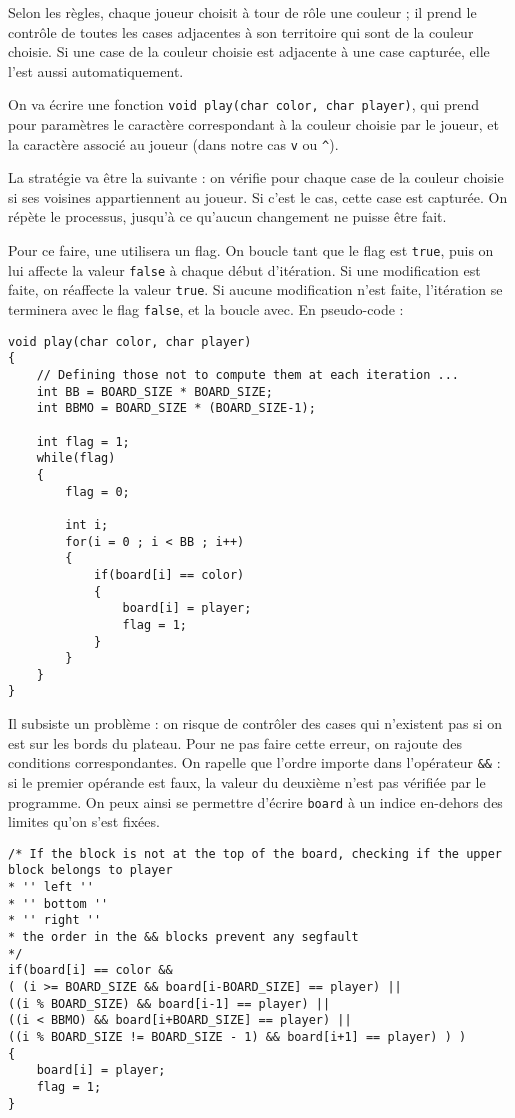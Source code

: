 \documentclass[a4paper,11pt]{article}
\begin{document}
	Selon les règles, chaque joueur choisit à tour de rôle une couleur ; il prend le contrôle de toutes les cases adjacentes à son territoire qui sont de la couleur choisie. Si une case de la couleur choisie est adjacente à une case capturée, elle l'est aussi automatiquement.
	
	On va écrire une fonction \texttt{void play(char color, char player)}, qui prend pour paramètres le caractère correspondant à la couleur choisie par le joueur, et la caractère associé au joueur (dans notre cas \texttt{v} ou \texttt{\^}).
	
	La stratégie va être la suivante : on vérifie pour chaque case de la couleur choisie si ses voisines appartiennent au joueur. Si c'est le cas, cette case est capturée. On répète le processus, jusqu'à ce qu'aucun changement ne puisse être fait.
	
	Pour ce faire, une utilisera un flag. On boucle tant que le flag est \texttt{true}, puis on lui affecte la valeur \texttt{false} à chaque début d'itération. Si une modification est faite, on réaffecte la valeur \texttt{true}. Si aucune modification n'est faite, l'itération se terminera avec le flag \texttt{false}, et la boucle avec. En pseudo-code :
	
	\begin{lstlisting}
void play(char color, char player)
{
	// Defining those not to compute them at each iteration ...
	int BB = BOARD_SIZE * BOARD_SIZE;
	int BBMO = BOARD_SIZE * (BOARD_SIZE-1);
	
	int flag = 1;
	while(flag)
	{
		flag = 0;
		
		int i;
		for(i = 0 ; i < BB ; i++)
		{
			if(board[i] == color)
			{
				board[i] = player;
				flag = 1;
			}
		}
	}
}
	\end{lstlisting}

	
	Il subsiste un problème : on risque de contrôler des cases qui n'existent pas si on est sur les bords du plateau. Pour ne pas faire cette erreur, on rajoute des conditions correspondantes. On rapelle que l'ordre importe dans l'opérateur \texttt{\&\&} : si le premier opérande est faux, la valeur du deuxième n'est pas vérifiée par le programme. On peux ainsi se permettre d'écrire \texttt{board} à un indice en-dehors des limites qu'on s'est fixées.
	
	\begin{lstlisting}
/* If the block is not at the top of the board, checking if the upper block belongs to player
* '' left ''
* '' bottom ''
* '' right ''
* the order in the && blocks prevent any segfault
*/
if(board[i] == color &&
( (i >= BOARD_SIZE && board[i-BOARD_SIZE] == player) ||
((i % BOARD_SIZE) && board[i-1] == player) ||
((i < BBMO) && board[i+BOARD_SIZE] == player) ||
((i % BOARD_SIZE != BOARD_SIZE - 1) && board[i+1] == player) ) )
{
	board[i] = player;
	flag = 1;
}
	\end{lstlisting}
	
\end{document}
